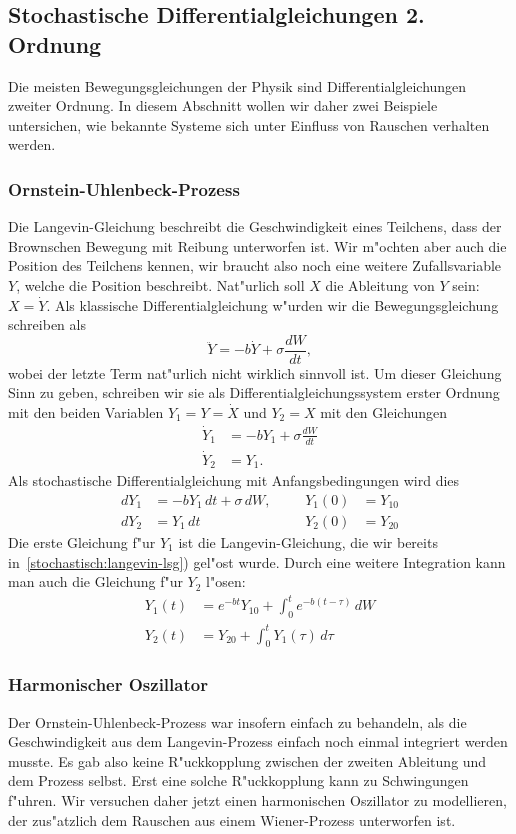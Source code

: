 \subsection{Stochastische Differentialgleichungen 2. Ordnung}
Die meisten Bewegungsgleichungen der Physik sind Differentialgleichungen
zweiter Ordnung.
In diesem Abschnitt wollen wir daher zwei Beispiele untersichen, wie
bekannte Systeme sich unter Einfluss von Rauschen verhalten werden.

\subsubsection{Ornstein-Uhlenbeck-Prozess}
Die Langevin-Gleichung beschreibt die Geschwindigkeit eines Teilchens,
dass der Brownschen Bewegung mit Reibung unterworfen ist.
Wir m"ochten aber auch die Position des Teilchens kennen, wir braucht
also noch eine weitere Zufallsvariable $Y$, welche die Position
beschreibt.
Nat"urlich soll $X$ die Ableitung von $Y$ sein: $X=\dot Y$.
Als klassische Differentialgleichung w"urden wir die Bewegungsgleichung
schreiben als
\[
\ddot Y=-b\dot Y+\sigma\frac{dW}{dt},
\]
wobei der letzte Term nat"urlich nicht wirklich sinnvoll ist.
Um dieser Gleichung Sinn zu geben, schreiben wir sie als
Differentialgleichungssystem erster Ordnung mit den beiden Variablen
$Y_1=Y=\dot X$ und $Y_2=X$ mit den Gleichungen
\begin{align*}
\dot Y_1&=-b Y_1+\sigma \frac{dW}{dt}\\
\dot Y_2&=Y_1.
\end{align*}
Als stochastische Differentialgleichung mit Anfangsbedingungen
wird dies
\begin{equation}
\begin{aligned}
dY_1&=-bY_1\,dt +\sigma\,dW,
&&&
Y_1(0)&=Y_{10}
\\
dY_2&=Y_1\,dt
&&&
Y_2(0)&=Y_{20}
\end{aligned}
\label{stochastisch:ornstein-uhlenbeck-dgl}
\end{equation}
Die erste Gleichung f"ur $Y_1$ ist die Langevin-Gleichung, die wir bereits
in~\ref{stochastisch:langevin-lsg}) gel"ost wurde.
Durch eine weitere Integration kann man auch die Gleichung f"ur $Y_2$
l"osen:
\begin{align*}
Y_1(t)&=e^{-bt}Y_{10}+\int_0^te^{-b(t-\tau)}\,dW\\
Y_2(t)&=Y_{20}+\int_0^t Y_1(\tau)\,d\tau
\end{align*}

\subsubsection{Harmonischer Oszillator}
Der Ornstein-Uhlenbeck-Prozess war insofern einfach zu behandeln, als 
die Geschwindigkeit aus dem Langevin-Prozess einfach noch einmal
integriert werden musste.
Es gab also keine R"uckkopplung zwischen der zweiten Ableitung und
dem Prozess selbst.
Erst eine solche R"uckkopplung kann zu Schwingungen f"uhren.
Wir versuchen daher jetzt einen harmonischen Oszillator zu modellieren,
der zus"atzlich dem Rauschen aus einem Wiener-Prozess unterworfen ist.

